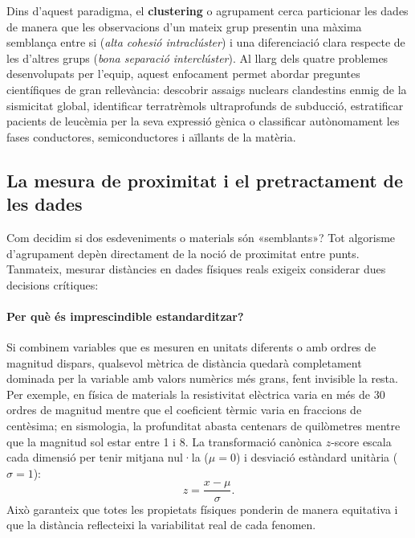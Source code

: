 \documentclass[a4paper,11pt]{article}
\begin{document}
Dins d'aquest paradigma, el \textbf{clustering} o agrupament cerca particionar les dades de manera que les observacions d'un mateix grup presentin una màxima semblança entre si (\emph{alta cohesió intraclúster}) i una diferenciació clara respecte de les d'altres grups (\emph{bona separació interclúster}). Al llarg dels quatre problemes desenvolupats per l'equip, aquest enfocament permet abordar preguntes científiques de gran rellevància: descobrir assaigs nuclears clandestins enmig de la sismicitat global, identificar terratrèmols ultraprofunds de subducció, estratificar pacients de leucèmia per la seva expressió gènica o classificar autònomament les fases conductores, semiconductores i aïllants de la matèria.

\subsection{La mesura de proximitat i el pretractament de les dades}

Com decidim si dos esdeveniments o materials són «semblants»? Tot algorisme d'agrupament depèn directament de la noció de proximitat entre punts. Tanmateix, mesurar distàncies en dades físiques reals exigeix considerar dues decisions crítiques:

\paragraph{Per què és imprescindible estandarditzar?} Si combinem variables que es mesuren en unitats diferents o amb ordres de magnitud dispars, qualsevol mètrica de distància quedarà completament dominada per la variable amb valors numèrics més grans, fent invisible la resta. Per exemple, en física de materials la resistivitat elèctrica varia en més de 30 ordres de magnitud mentre que el coeficient tèrmic varia en fraccions de centèsima; en sismologia, la profunditat abasta centenars de quilòmetres mentre que la magnitud sol estar entre 1 i 8. La transformació canònica $z$-score escala cada dimensió per tenir mitjana nul·la ($\mu = 0$) i desviació estàndard unitària ($\sigma = 1$):
\begin{equation}
    z = \frac{x - \mu}{\sigma}.
\end{equation}
Això garanteix que totes les propietats físiques ponderin de manera equitativa i que la distància reflecteixi la variabilitat real de cada fenomen.
\end{document}
